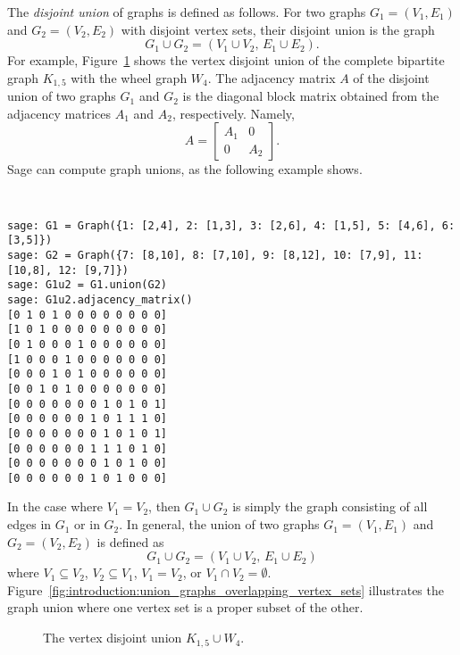 The \emph{disjoint union} of graphs is defined as follows. For two
graphs $G_1 = (V_1, E_1)$ and $G_2 = (V_2, E_2)$ with disjoint vertex
sets, their disjoint union is the graph
\[
G_1 \cup G_2
=
(V_1 \cup V_2,\, E_1 \cup E_2).
\]
For example,
Figure~\ref{fig:introduction:vertex_disjoint_union_K15_W4} shows the
vertex disjoint union of the complete bipartite graph $K_{1,5}$ with
the wheel graph $W_4$. The adjacency matrix $A$ of the disjoint union
of two graphs $G_1$ and $G_2$ is the diagonal block matrix obtained
from the adjacency matrices $A_1$ and $A_2$, respectively. Namely,
\[
A
=
\begin{bmatrix}
A_1 & 0 \\
0 & A_2
\end{bmatrix}.
\]
%
Sage can compute graph unions, as the following example shows.
%
\begin{center}
\fontsize{9pt}{9pt}
\selectfont
\tt
\begin{lstlisting}
sage: G1 = Graph({1: [2,4], 2: [1,3], 3: [2,6], 4: [1,5], 5: [4,6], 6: [3,5]})
sage: G2 = Graph({7: [8,10], 8: [7,10], 9: [8,12], 10: [7,9], 11: [10,8], 12: [9,7]})
sage: G1u2 = G1.union(G2)
sage: G1u2.adjacency_matrix()
[0 1 0 1 0 0 0 0 0 0 0 0]
[1 0 1 0 0 0 0 0 0 0 0 0]
[0 1 0 0 0 1 0 0 0 0 0 0]
[1 0 0 0 1 0 0 0 0 0 0 0]
[0 0 0 1 0 1 0 0 0 0 0 0]
[0 0 1 0 1 0 0 0 0 0 0 0]
[0 0 0 0 0 0 0 1 0 1 0 1]
[0 0 0 0 0 0 1 0 1 1 1 0]
[0 0 0 0 0 0 0 1 0 1 0 1]
[0 0 0 0 0 0 1 1 1 0 1 0]
[0 0 0 0 0 0 0 1 0 1 0 0]
[0 0 0 0 0 0 1 0 1 0 0 0]
\end{lstlisting}
\end{center}
%
In the case where $V_1 = V_2$, then $G_1 \cup G_2$ is simply the graph
consisting of all edges in $G_1$ or in $G_2$. In general, the union of
two graphs $G_1 = (V_1, E_1)$ and $G_2 = (V_2, E_2)$ is defined as
\[
G_1 \cup G_2
=
(V_1 \cup V_2,\, E_1 \cup E_2)
\]
where $V_1 \subseteq V_2$, $V_2 \subseteq V_1$, $V_1 = V_2$, or
$V_1 \cap V_2 = \emptyset$.
Figure~\ref{fig:introduction:union_graphs_overlapping_vertex_sets}
illustrates the graph union where one vertex set is a proper subset of
the other.

\begin{figure}[!htbp]
\centering
{}
\caption{The vertex disjoint union $K_{1,5} \cup W_4$.}
\label{fig:introduction:vertex_disjoint_union_K15_W4}
\end{figure}

